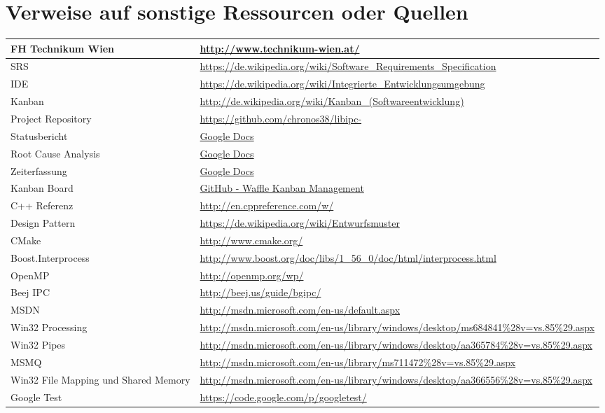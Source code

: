 \documentclass[a4paper]{book}
\begin{document}
\section{Verweise auf sonstige Ressourcen oder Quellen}
\begin{center}
\begin{longtable}{|p{3cm}|p{8cm}|}
\hline
FH Technikum Wien & \url{http://www.technikum-wien.at/} \\
\hline
SRS & \url{https://de.wikipedia.org/wiki/Software_Requirements_Specification} \\
\hline
IDE & \url{https://de.wikipedia.org/wiki/Integrierte_Entwicklungsumgebung} \\
\hline
Kanban & \url{http://de.wikipedia.org/wiki/Kanban_(Softwareentwicklung)} \\
\hline
Project Repository & \url{https://github.com/chronos38/libipc-} \\
\hline
Statusbericht & \href{https://docs.google.com/document/d/12IZJyU6WJ3upd81pHYRQ8KWd34AJqNXi5WnBbJPOtIQ/edit?usp=sharing}{Google Docs} \\
\hline
Root Cause Analysis & \href{https://docs.google.com/document/d/16PQXzEqp1hANgkXX1qEbKkaIwQ57bTGZWJuKGO_t0wA/edit?usp=sharing}{Google Docs} \\
\hline
Zeiterfassung & \href{https://docs.google.com/spreadsheet/ccc?key=0AuApAQ4FqnCEdHdiWThZX2V5b1BsM2lWYWdWSzZNRVE&usp=sharing}{Google Docs} \\
\hline
Kanban Board & \href{https://waffle.io/chronos38/libipc-}{GitHub - Waffle Kanban Management} \\
\hline
C++ Referenz & \url{http://en.cppreference.com/w/} \\
\hline
Design Pattern & \url{https://de.wikipedia.org/wiki/Entwurfsmuster} \\
\hline
CMake & \url{http://www.cmake.org/} \\
\hline
Boost.Interprocess & \url{http://www.boost.org/doc/libs/1_56_0/doc/html/interprocess.html} \\
\hline
OpenMP & \url{http://openmp.org/wp/} \\
\hline
Beej IPC & \url{http://beej.us/guide/bgipc/} \\
\hline
MSDN & \url{http://msdn.microsoft.com/en-us/default.aspx} \\
\hline
Win32 Processing & \url{http://msdn.microsoft.com/en-us/library/windows/desktop/ms684841\%28v=vs.85\%29.aspx} \\
\hline
Win32 Pipes & \url{http://msdn.microsoft.com/en-us/library/windows/desktop/aa365784\%28v=vs.85\%29.aspx} \\
\hline
MSMQ & \url{http://msdn.microsoft.com/en-us/library/ms711472\%28v=vs.85\%29.aspx} \\
\hline
Win32 File Mapping und Shared Memory & \url{http://msdn.microsoft.com/en-us/library/windows/desktop/aa366556\%28v=vs.85\%29.aspx} \\
\hline
Google Test & \url{https://code.google.com/p/googletest/} \\
\hline
\end{longtable}
\end{center}
\end{document}
